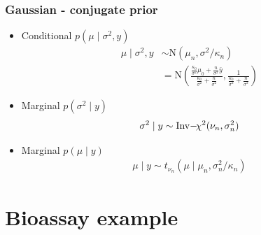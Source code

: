 \documentclass[10pt]{beamer}
\begin{document}
\begin{frame}
 \frametitle{Gaussian - conjugate prior}

  \begin{itemize}
 \item Conditional $p(\mu \mid \sigma^2,y)$
    \begin{align*}
     \mu \mid \sigma^2,y & \sim \mathrm{N}(\mu_n,\sigma^2/\kappa_n)\\
     & =  \mathrm{N}\left(\frac{\frac{\kappa_0}{\sigma^2}\mu_0+\frac{n}{\sigma^2}\bar{y}}{\frac{\kappa_0}{\sigma^2}+\frac{n}{\sigma^2}},\frac{1}{\frac{\kappa_0}{\sigma^2}+\frac{n}{\sigma^2}}\right)
    \end{align*}
  \vspace{-2mm}
  \pause
 \item Marginal $p(\sigma^2 \mid y)$
  \begin{align*}
      \sigma^2 \mid y \sim \operatorname{Inv}\!-\!\chi^2(\nu_n,\sigma_n^2)
   \end{align*}
    \vspace{-6mm}
  \pause
  \item Marginal $p(\mu \mid y)$
   \begin{align*}
     \mu \mid y \sim t_{\nu_n}(\mu \mid \mu_n,\sigma_n^2/\kappa_n)
   \end{align*}
  \end{itemize}

\end{frame}


\section{Bioassay example}
\end{document}
